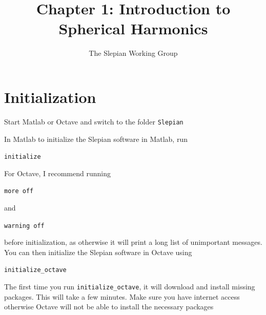 \documentclass[11pt]{article}
\title{Chapter 1: Introduction to Spherical Harmonics}
\author{The Slepian Working Group}
\begin{document}
\maketitle

\section{Initialization}

Start Matlab or Octave and switch to the folder \verb+Slepian+

In Matlab to initialize the Slepian software in Matlab, run

\qquad \verb+initialize+

For Octave, I recommend running

\qquad \verb+more off+

and

\qquad \verb+warning off+

before initialization, as otherwise it will print a long list of unimportant messages. You can then initialize the Slepian software in Octave using

\qquad \verb+initialize_octave+

The first time you run \verb+initialize_octave+, it will download and install
missing packages. This will take a few minutes. Make sure you have
internet access otherwise Octave will not be able to install the necessary packages










\end{document}
